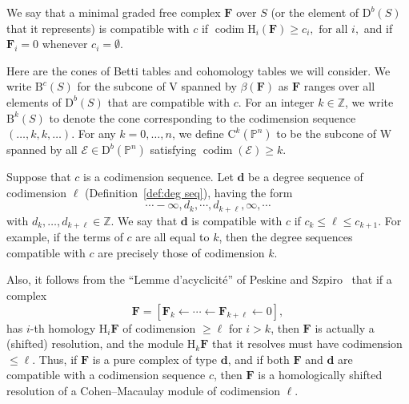 \documentclass[12pt]{amsart}
\theoremstyle{definition}
\theoremstyle{remark}
\newtheorem{defn}[lemma]{Definition}
\newcommand{\codim}{\operatorname{codim}}
\newcommand{\PP}{\mathbb{P}}
\newcommand{\HH}{\mathrm{H}}
\newcommand{\ZZ}{\mathbb{Z}}
\newcommand{\VV}{\mathrm{V}}
\newcommand{\WW}{\mathrm{W}}
\newcommand{\cc}{c}
\newcommand{\dd}{\mathbf{d}}
\newcommand{\cE}{\mathcal{E}}
\newcommand{\FF}{\mathbf{F}}
\newcommand{\defi}[1]{\textsf{#1}} %
\newcommand{\nothing}{\emptyset}
\newcommand{\DD}{\mathrm{D}}
\newcommand{\CQ}{\mathrm{C}}
\newcommand{\BBQ}{\mathrm{B}}
\newcommand{\daniel}[1]{{\color{green} \sf $\clubsuit\clubsuit\clubsuit$ Daniel: [#1]}}
\begin{document}
We say that a
minimal graded free complex $\FF$ over $S$ (or the element of $\DD^{b}(S)$ that it represents) is \defi{compatible with $\cc$} if 
$
\codim \HH_i(\FF) \geq c_i, \text{ for all } i,
$
and if $\FF_i=0$ whenever $c_i=\nothing$.


Here are the cones of Betti tables and cohomology tables we will consider.
We write $\BBQ^{\cc}(S)$ for the subcone of $\VV$ spanned by $\beta(\FF)$ as $\FF$ ranges over all elements of $\DD^b(S)$ that are compatible with $\cc$.  For an integer $k\in \ZZ$, we write $\BBQ^k(S)$ to denote the cone corresponding to the codimension sequence $(\dots, k,k,\dots)$.
For any $k=0, \dots, n$, we define $\CQ^k(\PP^n)$ to be the subcone of $\WW$ spanned by all $\cE\in \DD^b(\PP^n)$ satisfying $\codim(\cE)\geq k$.

Suppose that $\cc$ is a codimension sequence. Let $\dd$ be a degree sequence 
of codimension $\ell$ (Definition~\ref{def:deg seq}), having the form
$$
\cdots -\infty, d_{k}, \cdots, d_{k+\ell}, \infty, \cdots
$$
with $d_{k},\dots, d_{k+\ell}\in \ZZ$.
We say that $\dd$ is \defi{compatible} with $\cc$ if $c_{k}\leq \ell \leq c_{k+1}$. 
For example, if the terms of $\cc$ are all equal to $k$, then the degree sequences
compatible with $\cc$ are precisely those of codimension $k$.

Also, it follows from the ``Lemme d'acyclicit\'e'' of Peskine and Szpiro~\cite{MR0374130}
that if a complex
$$
\FF= [\FF_{k}\leftarrow \cdots \leftarrow \FF_{k+\ell}\leftarrow 0],
$$
has $i$-th homology $\HH_{i}\FF$ of codimension $\geq\ell$ for $i>k$, then $\FF$ is actually a (shifted) resolution, and the module $\HH_{k}\FF$ that it resolves must have codimension $\leq \ell$. 
Thus, if $\FF$ is a pure complex of type $\dd$, and if both $\FF$ and $\dd$ are compatible with a codimension sequence $\cc$, then $\FF$ is a homologically
shifted resolution of a Cohen--Macaulay module of codimension $\ell$.
\end{document}
